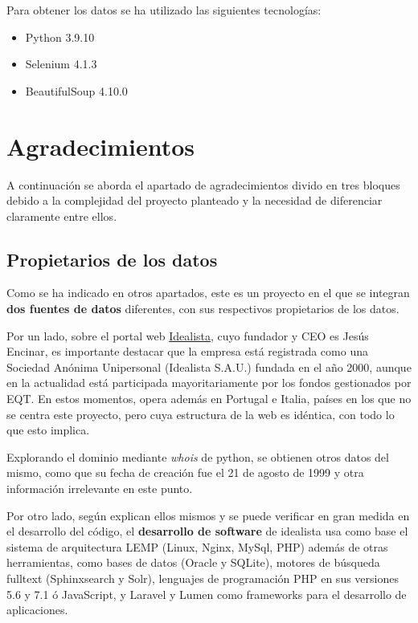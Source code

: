 \documentclass[12pt]{article}
\begin{document}
Para obtener los datos se ha utilizado las siguientes tecnologías:

\begin{multicols}{3}
	\begin{itemize}[topsep=0cm,partopsep=0cm,wide]
		\item Python 3.9.10
		\item Selenium 4.1.3
		\item BeautifulSoup 4.10.0
	\end{itemize}
\end{multicols}

\vspace{-1.5em}\section{Agradecimientos}\vspace{-1.0em}

A continuación se aborda el apartado de agradecimientos divido en tres bloques debido a la complejidad del proyecto planteado y la necesidad de diferenciar claramente entre ellos. 

\vspace{-1.5em}\subsection*{Propietarios de los datos}\vspace{-1.0em}

Como se ha indicado en otros apartados, este es un proyecto en el que se integran \textbf{dos fuentes de datos} diferentes, con sus respectivos propietarios de los datos. 

Por un lado, sobre el portal web \href{http://www.idealista.com}{Idealista}, cuyo fundador y CEO es Jesús Encinar, es importante destacar que la empresa está registrada como una Sociedad Anónima Unipersonal (Idealista S.A.U.) fundada en el año 2000, aunque en la actualidad está participada mayoritariamente por los fondos gestionados por EQT. En estos momentos, opera además en Portugal e Italia, países en los que no se centra este proyecto, pero cuya estructura de la web es idéntica, con todo lo que esto implica. 

Explorando el dominio mediante \textit{whois} de python, se obtienen otros datos del mismo, como que su fecha de creación fue el 21 de agosto de 1999 y otra información irrelevante en este punto.

Por otro lado, según explican ellos mismos y se puede verificar en gran medida en el desarrollo del código, el \textbf{desarrollo de software} de idealista usa como base el sistema de arquitectura LEMP (Linux, Nginx, MySql, PHP) además de otras herramientas, como bases de datos (Oracle y SQLite), motores de búsqueda fulltext (Sphinxsearch y Solr), lenguajes de programación PHP en sus versiones 5.6 y 7.1 ó JavaScript, y Laravel y Lumen como frameworks para el desarrollo de aplicaciones.
\end{document}
